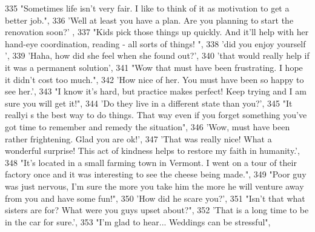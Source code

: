 \begin{DoxyCode}
335                             \textcolor{stringliteral}{"Sometimes life isn't very fair. I like to think of it as motivation to get a
       better job."},
336                             \textcolor{stringliteral}{'Well at least you have a plan. Are you planning to start the renovation soon?'}
      ,
337                             \textcolor{stringliteral}{"Kids pick those things up quickly.  And it'll help with her hand-eye
       coordination, reading - all sorts of things!  "},
338                             \textcolor{stringliteral}{'did you enjoy yourself '},
339                             \textcolor{stringliteral}{'Haha, how did she feel when she found out?'},
340                             \textcolor{stringliteral}{'that would really help if it was a permanent solution'},
341                             \textcolor{stringliteral}{"Wow that must have been frustrating.  I hope it didn't cost too much."},
342                             \textcolor{stringliteral}{'How nice of her. You must have been so happy to see her.'},
343                             \textcolor{stringliteral}{"I know it's hard, but practice makes perfect! Keep trying and I am sure you
       will get it!"},
344                             \textcolor{stringliteral}{'Do they live in a different state than you?'},
345                             \textcolor{stringliteral}{"It reallyi s the best way to do things. That way even if you forget something
       you've got time to remember and remedy the situation"},
346                             \textcolor{stringliteral}{'Wow, must have been rather frightening. Glad you are ok!'},
347                             \textcolor{stringliteral}{'That was really nice!  What a wonderful surprise!  This act of kindness helps
       to restore my faith in humanity.'},
348                             \textcolor{stringliteral}{"It's located in a small farming town in Vermont. I went on a tour of their
       factory once and it was interesting to see the cheese being made."},
349                             \textcolor{stringliteral}{"Poor guy was just nervous, I'm sure the more you take him the more he will
       venture away from you and have some fun!"},
350                             \textcolor{stringliteral}{'How did he scare you?'},
351                             \textcolor{stringliteral}{"Isn't that what sisters are for?  What were you guys upset about?"},
352                             \textcolor{stringliteral}{'That is a long time to be in the car for sure.'},
353                             \textcolor{stringliteral}{"I'm glad to hear... Weddings can be stressful"},

\end{DoxyCode}
